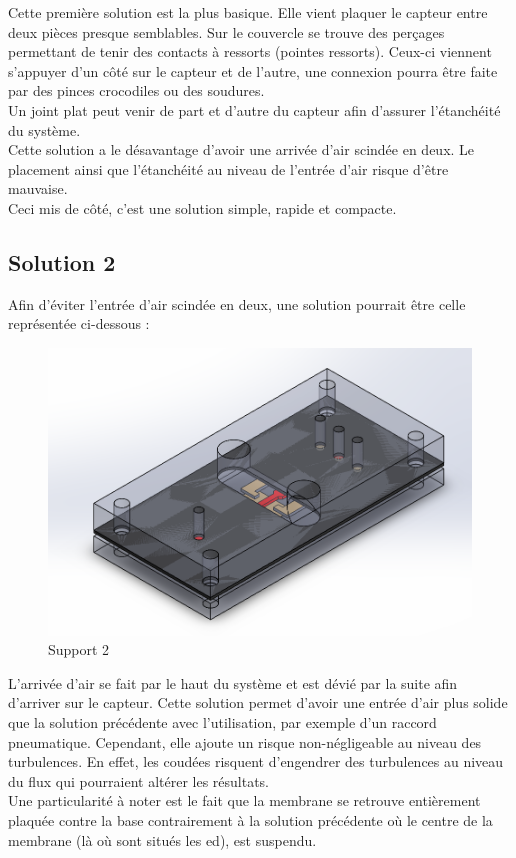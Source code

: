 Cette première solution est la plus basique. Elle vient plaquer le capteur entre deux pièces presque semblables. Sur le couvercle se trouve des
perçages permettant de tenir des contacts à ressorts (pointes ressorts). Ceux-ci viennent s'appuyer d'un côté sur le capteur et
de l'autre, une  connexion pourra être faite par des pinces crocodiles ou des soudures. \\
Un joint plat peut venir de part et d'autre du capteur afin d'assurer l'étanchéité du système.\\
Cette solution a le désavantage d'avoir une arrivée d'air scindée en deux. Le placement ainsi que l'étanchéité au niveau de l'entrée
d'air risque d'être mauvaise. \\
Ceci mis de côté, c'est une solution simple, rapide et compacte.

\subsection{Solution 2}
Afin d'éviter l'entrée d'air scindée en deux, une solution pourrait être celle représentée ci-dessous :
\begin{figure}[H]
    \centering
    \includegraphics[scale = 0.4]{images/Capteur_design2_caoutch.png}
    \caption{Support 2}
    \label{fig:solution2}
\end{figure}
L'arrivée d'air se fait par le haut du système et est dévié par la suite afin d'arriver sur le capteur. Cette solution permet d'avoir une
entrée d'air plus solide que la solution précédente avec l'utilisation, par exemple d'un raccord pneumatique. Cependant, elle ajoute un risque 
non-négligeable au niveau des turbulences. En effet, les coudées risquent d'engendrer des turbulences au niveau du flux qui pourraient altérer 
les résultats.\\
Une particularité à noter est le fait que la membrane se retrouve entièrement plaquée contre la base contrairement à la solution
précédente où le centre de la membrane (là où sont situés les \gls{ed}), est suspendu.

